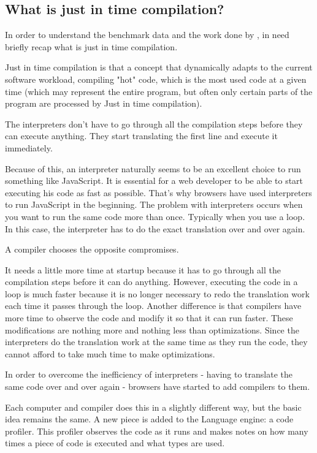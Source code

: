 \documentclass{article}
\begin{document}
\subsection{What is just in time compilation? }

In order to understand the benchmark data and the work done by \citep{barrett2017virtual}, in need briefly recap what is just in time compilation.

Just in time compilation \citep{aycock2003brief} is that a concept that dynamically adapts to the current software workload, compiling "hot" code, which is the most used code at a given time (which may represent the entire program, but often only certain parts of the program are processed by Just in time compilation).

The interpreters don't have to go through all the compilation steps before they can execute anything. They start translating the first line and execute it immediately.

Because of this, an interpreter naturally seems to be an excellent choice to run something like JavaScript. It is essential for a web developer to be able to start executing his code as fast as possible. That's why browsers have used interpreters to run JavaScript in the beginning.
The problem with interpreters occurs when you want to run the same code more than once. Typically when you use a loop. In this case, the interpreter has to do the exact translation over and over again.

A compiler chooses the opposite compromises.

It needs a little more time at startup because it has to go through all the compilation steps before it can do anything. However, executing the code in a loop is much faster because it is no longer necessary to redo the translation work each time it passes through the loop.
Another difference is that compilers have more time to observe the code and modify it so that it can run faster. These modifications are nothing more and nothing less than optimizations. Since the interpreters do the translation work at the same time as they run the code, they cannot afford to take much time to make optimizations.

In order to overcome the inefficiency of interpreters - having to translate the same code over and over again - browsers have started to add compilers to them.

Each computer and compiler does this in a slightly different way, but the basic idea remains the same. A new piece is added to the Language engine: a code profiler. This profiler observes the code as it runs and makes notes on how many times a piece of code is executed and what types are used.
\end{document}
